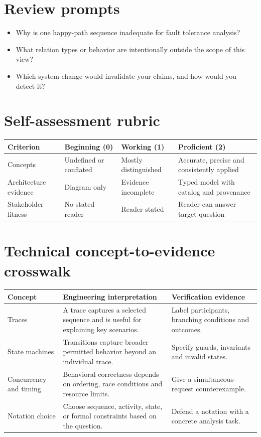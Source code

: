 \documentclass[10pt,letterpaper]{article}
\begin{document}
\section{Review prompts}
\begin{itemize}
\item Why is one happy-path sequence inadequate for fault tolerance analysis?
\item What relation types or behavior are intentionally outside the scope of this view?
\item Which system change would invalidate your claims, and how would you detect it?
\end{itemize}
\section{Self-assessment rubric}
\small
\begin{tabularx}{\linewidth}{@{}YYYY@{}}
\toprule
\textbf{Criterion} & \textbf{Beginning (0)} & \textbf{Working (1)} & \textbf{Proficient (2)} \\
\midrule
Concepts & Undefined or conflated & Mostly distinguished & Accurate, precise and consistently applied \\
Architecture evidence & Diagram only & Evidence incomplete & Typed model with catalog and provenance \\
Stakeholder fitness & No stated reader & Reader stated & Reader can answer target question \\
\bottomrule
\end{tabularx}
\normalsize
\section{Technical concept-to-evidence crosswalk}
\small
\begin{tabularx}{\linewidth}{@{}YYY@{}}
\toprule
\textbf{Concept} & \textbf{Engineering interpretation} & \textbf{Verification evidence} \\
\midrule
Traces & A trace captures a selected sequence and is useful for explaining key scenarios. & Label participants, branching conditions and outcomes. \\
State machines & Transitions capture broader permitted behavior beyond an individual trace. & Specify guards, invariants and invalid states. \\
Concurrency and timing & Behavioral correctness depends on ordering, race conditions and resource limits. & Give a simultaneous-request counterexample. \\
Notation choice & Choose sequence, activity, state, or formal constraints based on the question. & Defend a notation with a concrete analysis task. \\
\bottomrule
\end{tabularx}
\normalsize
\end{document}
